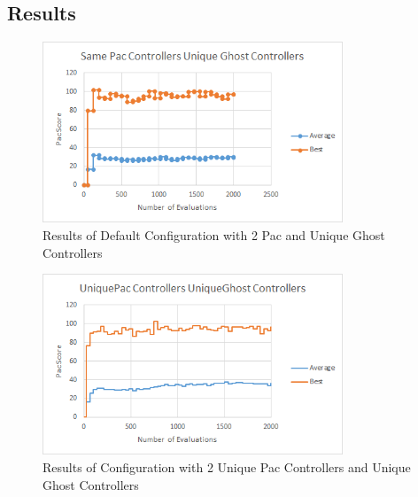 \documentclass{article}
\begin{document}
\subsection{Results}
\begin{flushleft}
\begin{figure}[h]
	\centering
	\includegraphics[width=0.8\textwidth]{samePacDiffGhost}
	\caption{Results of Default Configuration with 2 Pac and Unique Ghost Controllers}
\end{figure}

\begin{figure}[h]
	\centering
	\includegraphics[width=0.8\textwidth]{diffPacDiffGhost}
	\caption{Results of Configuration with 2 Unique Pac Controllers and Unique Ghost Controllers}
\end{figure}
\end{flushleft}

\clearpage
\end{document}
